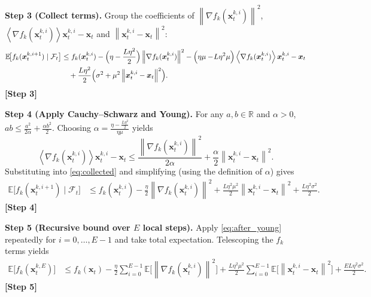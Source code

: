 \documentclass{article}
\newcommand{\E}{\mathbb{E}}
\newcommand{\R}{\mathbb{R}}
\newcommand{\norm}[1]{\left\lVert #1\right\rVert}
\newcommand{\inner}[1]{\left\langle #1\right\rangle}
\begin{document}
\noindent\textbf{Step 3 (Collect terms).}
Group the coefficients of $\norm{\nabla f_k(\bm{x}_{t}^{k,i})}^{2}$,
$\inner{\nabla f_k(\bm{x}_{t}^{k,i})}{\bm{x}_{t}^{k,i}-\bm{x}_t}$ and
$\norm{\bm{x}_{t}^{k,i}-\bm{x}_t}^{2}$:
\begin{align}
\E\!\bigl[f_k(\bm{x}_{t}^{k,i+1})\mid\mathcal{F}_t\bigr]
&\le f_k(\bm{x}_{t}^{k,i})
   -\Bigl(\eta-\frac{L\eta^{2}}{2}\Bigr)\norm{\nabla f_k(\bm{x}_{t}^{k,i})}^{2}
   -\Bigl(\eta\mu-\!L\eta^{2}\mu\Bigr)
        \inner{\nabla f_k(\bm{x}_{t}^{k,i})}{\bm{x}_{t}^{k,i}-\bm{x}_t}
   \nonumber\\
&\quad
   +\frac{L\eta^{2}}{2}\Bigl(\sigma^{2}
          +\mu^{2}\norm{\bm{x}_{t}^{k,i}-\bm{x}_t}^{2}\Bigr) .
\label{eq:collected}
\end{align}
\textbf{[Step 3]}

\noindent\textbf{Step 4 (Apply Cauchy–Schwarz and Young).}
For any $a,b\in\R$ and $\alpha>0$, $ab\le \frac{a^{2}}{2\alpha}+\frac{\alpha b^{2}}{2}$.
Choosing $\alpha = \frac{\eta-\tfrac{L\eta^{2}}{2}}{\eta\mu}$ yields
\[
\inner{\nabla f_k(\bm{x}_{t}^{k,i})}{\bm{x}_{t}^{k,i}-\bm{x}_t}
\le
\frac{\norm{\nabla f_k(\bm{x}_{t}^{k,i})}^{2}}{2\alpha}
   +\frac{\alpha}{2}\norm{\bm{x}_{t}^{k,i}-\bm{x}_t}^{2}.
\]
Substituting into \eqref{eq:collected} and simplifying (using the definition of
$\alpha$) gives
\begin{align}
\E\!\bigl[f_k(\bm{x}_{t}^{k,i+1})\mid\mathcal{F}_t\bigr]
&\le f_k(\bm{x}_{t}^{k,i})
   -\frac{\eta}{2}\norm{\nabla f_k(\bm{x}_{t}^{k,i})}^{2}
   +\frac{L\eta^{2}\mu^{2}}{2}\norm{\bm{x}_{t}^{k,i}-\bm{x}_t}^{2}
   +\frac{L\eta^{2}\sigma^{2}}{2} .
\label{eq:after_young}
\end{align}
\textbf{[Step 4]}

\noindent\textbf{Step 5 (Recursive bound over $E$ local steps).}
Apply \eqref{eq:after_young} repeatedly for $i=0,\dots,E-1$ and take total
expectation.  Telescoping the $f_k$ terms yields
\begin{align}
\E\!\bigl[f_k(\bm{x}_{t}^{k,E})\bigr]
&\le f_k(\bm{x}_t)
   -\frac{\eta}{2}\sum_{i=0}^{E-1}
        \E\!\bigl[\norm{\nabla f_k(\bm{x}_{t}^{k,i})}^{2}\bigr]
   +\frac{L\eta^{2}\mu^{2}}{2}\sum_{i=0}^{E-1}
        \E\!\bigl[\norm{\bm{x}_{t}^{k,i}-\bm{x}_t}^{2}\bigr]
   +\frac{E L\eta^{2}\sigma^{2}}{2}.
\label{eq:after_E}
\end{align}
\textbf{[Step 5]}
\end{document}
